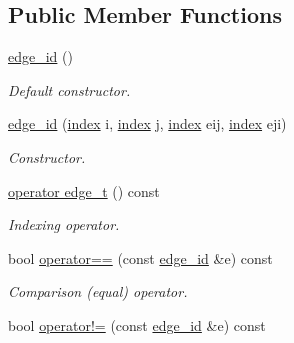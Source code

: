 \subsection*{Public Member Functions}
\begin{DoxyCompactItemize}
\item 
\hyperlink{structmerlin_1_1edge__id_a25b381b111897b738de30780ab918209}{edge\+\_\+id} ()\hypertarget{structmerlin_1_1edge__id_a25b381b111897b738de30780ab918209}{}\label{structmerlin_1_1edge__id_a25b381b111897b738de30780ab918209}

\begin{DoxyCompactList}\small\item\em Default constructor. \end{DoxyCompactList}\item 
\hyperlink{structmerlin_1_1edge__id_a941cde8b90f6251aaa51bda5bb15b50d}{edge\+\_\+id} (\hyperlink{structmerlin_1_1edge__id_af57e3c1f2c2c3194d96468a5f0e7cce0}{index} i, \hyperlink{structmerlin_1_1edge__id_af57e3c1f2c2c3194d96468a5f0e7cce0}{index} j, \hyperlink{structmerlin_1_1edge__id_af57e3c1f2c2c3194d96468a5f0e7cce0}{index} eij, \hyperlink{structmerlin_1_1edge__id_af57e3c1f2c2c3194d96468a5f0e7cce0}{index} eji)
\begin{DoxyCompactList}\small\item\em Constructor. \end{DoxyCompactList}\item 
\hyperlink{structmerlin_1_1edge__id_a68ca5f45ac200267ba879aaa3007e61a}{operator edge\+\_\+t} () const \hypertarget{structmerlin_1_1edge__id_a68ca5f45ac200267ba879aaa3007e61a}{}\label{structmerlin_1_1edge__id_a68ca5f45ac200267ba879aaa3007e61a}

\begin{DoxyCompactList}\small\item\em Indexing operator. \end{DoxyCompactList}\item 
bool \hyperlink{structmerlin_1_1edge__id_a46c12ab826171c62a5d80e309bea9a3a}{operator==} (const \hyperlink{structmerlin_1_1edge__id}{edge\+\_\+id} \&e) const \hypertarget{structmerlin_1_1edge__id_a46c12ab826171c62a5d80e309bea9a3a}{}\label{structmerlin_1_1edge__id_a46c12ab826171c62a5d80e309bea9a3a}

\begin{DoxyCompactList}\small\item\em Comparison (equal) operator. \end{DoxyCompactList}\item 
bool \hyperlink{structmerlin_1_1edge__id_abfe3dfe6fe440f8a975db5f7f9fbba0c}{operator!=} (const \hyperlink{structmerlin_1_1edge__id}{edge\+\_\+id} \&e) const \hypertarget{structmerlin_1_1edge__id_abfe3dfe6fe440f8a975db5f7f9fbba0c}{}\label{structmerlin_1_1edge__id_abfe3dfe6fe440f8a975db5f7f9fbba0c}


\end{DoxyCompactItemize}
